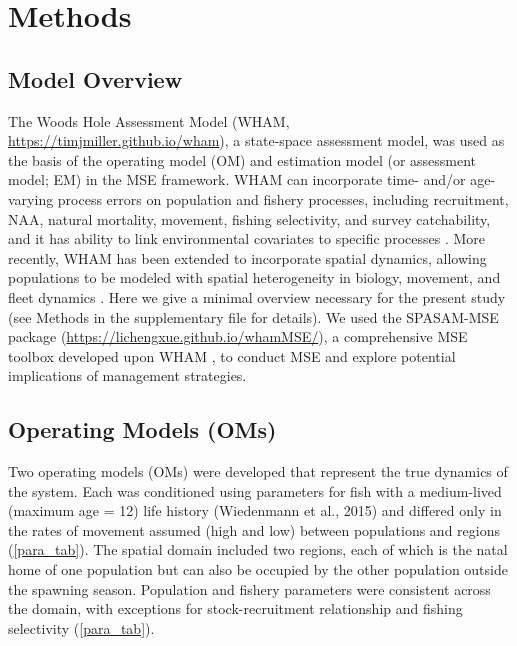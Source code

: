 \documentclass[
  12pt,
]{article}
\begin{document}
\hypertarget{methods}{%
\section{Methods}\label{methods}}

\hypertarget{model-overview}{%
\subsection{Model Overview}\label{model-overview}}

The Woods Hole Assessment Model (WHAM,
\url{https://timjmiller.github.io/wham}), a state-space assessment
model, was used as the basis of the operating model (OM) and estimation
model (or assessment model; EM) in the MSE framework. WHAM can
incorporate time- and/or age-varying process errors on population and
fishery processes, including recruitment, NAA, natural mortality,
movement, fishing selectivity, and survey catchability, and it has
ability to link environmental covariates to specific processes
\citep{Stock2021a}. More recently, WHAM has been extended to incorporate
spatial dynamics, allowing populations to be modeled with spatial
heterogeneity in biology, movement, and fleet dynamics
\citep{Miller2025}. Here we give a minimal overview necessary for the
present study (see Methods in the supplementary file for details). We
used the SPASAM-MSE package
(\url{https://lichengxue.github.io/whamMSE/}), a comprehensive MSE
toolbox developed upon WHAM \citep{Liinreview2}, to conduct MSE and
explore potential implications of management strategies.

\hypertarget{operating-models-oms}{%
\subsection{Operating Models (OMs)}\label{operating-models-oms}}

Two operating models (OMs) were developed that represent the true
dynamics of the system. Each was conditioned using parameters for fish
with a medium-lived (maximum age = 12) life history (Wiedenmann et al.,
2015) and differed only in the rates of movement assumed (high and low)
between populations and regions (\autoref{para_tab}). The spatial domain
included two regions, each of which is the natal home of one population
but can also be occupied by the other population outside the spawning
season. Population and fishery parameters were consistent across the
domain, with exceptions for stock-recruitment relationship and fishing
selectivity (\autoref{para_tab}).
\end{document}
